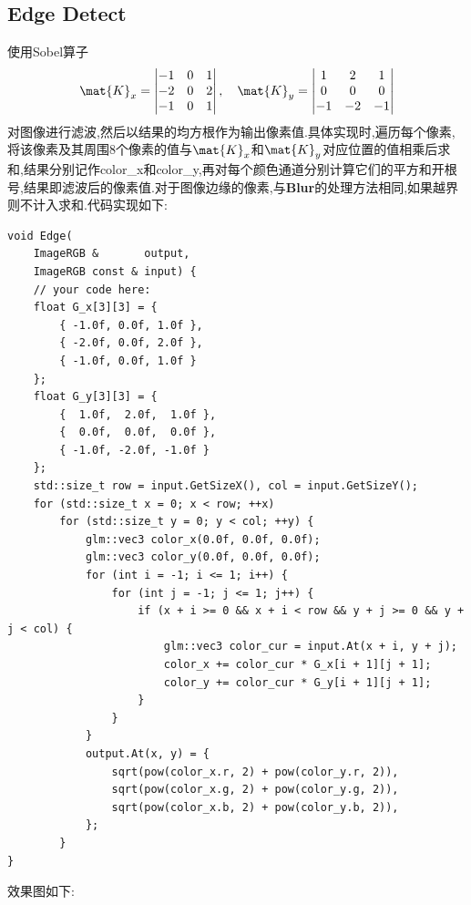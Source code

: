 \documentclass{ctexart}
\begin{document}
\subsection*{Edge Detect}
使用Sobel算子
\[\mat{K}_x=\begin{vmatrix}
    -1&0&1\\
    -2&0&2\\
    -1&0&1
\end{vmatrix},\quad\mat{K}_y=\begin{vmatrix}
    1&2&1\\
    0&0&0\\
    -1&-2&-1
\end{vmatrix}\]
对图像进行滤波,然后以结果的均方根作为输出像素值.具体实现时,遍历每个像素,将该像素及其周围8个像素的值与$\mat{K}_x$和$\mat{K}_y$对应位置的值相乘后求和,结果分别记作{\codefont color\_x}和{\codefont color\_y},再对每个颜色通道分别计算它们的平方和开根号,结果即滤波后的像素值.对于图像边缘的像素,与\textbf{Blur}的处理方法相同,如果越界则不计入求和.代码实现如下:
\begin{lstlisting}
void Edge(
    ImageRGB &       output,
    ImageRGB const & input) {
    // your code here:
    float G_x[3][3] = {
        { -1.0f, 0.0f, 1.0f },
        { -2.0f, 0.0f, 2.0f },
        { -1.0f, 0.0f, 1.0f }
    };
    float G_y[3][3] = {
        {  1.0f,  2.0f,  1.0f },
        {  0.0f,  0.0f,  0.0f },
        { -1.0f, -2.0f, -1.0f }
    };
    std::size_t row = input.GetSizeX(), col = input.GetSizeY();
    for (std::size_t x = 0; x < row; ++x)
        for (std::size_t y = 0; y < col; ++y) {
            glm::vec3 color_x(0.0f, 0.0f, 0.0f);
            glm::vec3 color_y(0.0f, 0.0f, 0.0f);
            for (int i = -1; i <= 1; i++) {
                for (int j = -1; j <= 1; j++) {
                    if (x + i >= 0 && x + i < row && y + j >= 0 && y + j < col) {
                        glm::vec3 color_cur = input.At(x + i, y + j);
                        color_x += color_cur * G_x[i + 1][j + 1];
                        color_y += color_cur * G_y[i + 1][j + 1];
                    }
                }
            }
            output.At(x, y) = {
                sqrt(pow(color_x.r, 2) + pow(color_y.r, 2)),
                sqrt(pow(color_x.g, 2) + pow(color_y.g, 2)),
                sqrt(pow(color_x.b, 2) + pow(color_y.b, 2)),
            };
        }
}
\end{lstlisting}
效果图如下:
\end{document}

